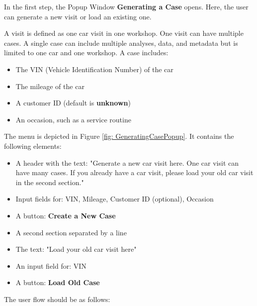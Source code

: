 \documentclass[]{scrreprt}
\begin{document}
In the first step, the Popup Window \textbf{Generating a Case} opens. Here, the user can generate a new visit or load an existing one.


A visit is defined as one car visit in one workshop. One visit can have multiple cases.
A single case can include multiple analyses, data, and metadata but is limited to one car and one workshop. A case includes:
\begin{itemize}
    \item The VIN (Vehicle Identification Number) of the car
    \item The mileage of the car
    \item A customer ID (default is \textbf{unknown})
    \item An occasion, such as a service routine
\end{itemize}


The menu is depicted in Figure \ref{fig: GeneratingCasePopup}. It contains the following elements:
\begin{itemize}
    \item A header with the text: "Generate a new car visit here. One car visit can have many cases. If you already have a car visit, please load your old car visit in the second section."
    \item Input fields for: VIN, Mileage, Customer ID (optional), Occasion
    \item A button: \textbf{Create a New Case}
    \item A second section separated by a line
    \item The text: "Load your old car visit here"
    \item An input field for: VIN
    \item A button: \textbf{Load Old Case}
\end{itemize}


The user flow should be as follows:
\end{document}
